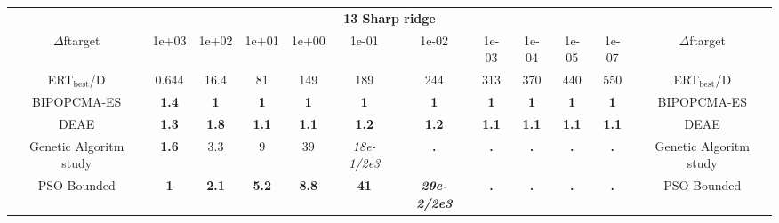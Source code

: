 \begin{tabular}{cccccccccccc}
 & \multicolumn{10}{c}{{\normalsize \textbf{13 Sharp ridge}}}\\
$\Delta$ftarget& 1e+03& 1e+02& 1e+01& 1e+00& 1e-01& 1e-02& 1e-03& 1e-04& 1e-05& 1e-07 & $\Delta$ftarget \\
ERT$_{\textrm{best}}$/D& 0.644& 16.4& 81& 149& 189& 244& 313& 370& 440& 550 & ERT$_{\textrm{best}}$/D \\
\hline
BIPOPCMA-ES & \textbf{1.4} & \textbf{1} & \textbf{1} & \textbf{1} & \textbf{1} & \textbf{1} & \textbf{1} & \textbf{1} & \textbf{1} & \textbf{1} & BIPOPCMA-ES \cite{add_an_entry_for_BIPOPCMA-ES_in_bbob.bib}\\
DEAE & \textbf{1.3} & \textbf{1.8} & \textbf{1.1} & \textbf{1.1} & \textbf{1.2} & \textbf{1.2} & \textbf{1.1} & \textbf{1.1} & \textbf{1.1} & \textbf{1.1} & DEAE \cite{add_an_entry_for_DEAE_in_bbob.bib}\\
Genetic Algoritm study & \textbf{1.6} & 3.3 & 9 & 39 & \textit{18e-1}\textit{/2e3} & \textbf{.} & \textbf{.} & \textbf{.} & \textbf{.} & \textbf{.} & Genetic Algoritm study \cite{add_an_entry_for_Genetic Algoritm study_in_bbob.bib}\\
PSO Bounded & \textbf{1} & \textbf{2.1} & \textbf{5.2} & \textbf{8.8} & \textbf{41} & \textbf{\textit{29e-2}\textit{/2e3}} & \textbf{.} & \textbf{.} & \textbf{.} & \textbf{.} & PSO Bounded \cite{add_an_entry_for_PSO Bounded_in_bbob.bib}
\end{tabular}

